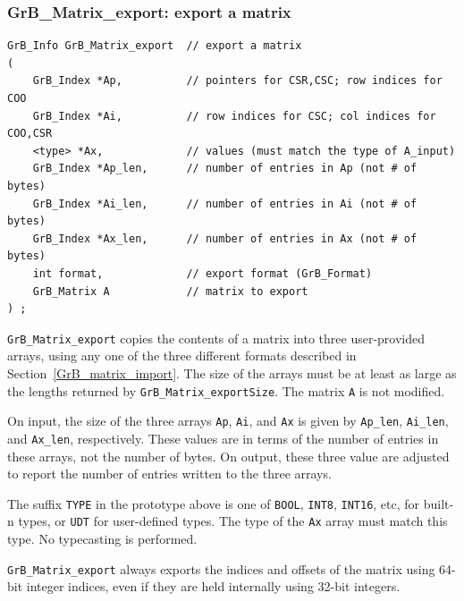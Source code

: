\subsubsection{{\sf GrB\_Matrix\_export:}  export a matrix}
\label{GrB_matrix_export}

\begin{mdframed}[userdefinedwidth=6in]
{\footnotesize
\begin{verbatim}
GrB_Info GrB_Matrix_export  // export a matrix
(
    GrB_Index *Ap,          // pointers for CSR,CSC; row indices for COO
    GrB_Index *Ai,          // row indices for CSC; col indices for COO,CSR
    <type> *Ax,             // values (must match the type of A_input)
    GrB_Index *Ap_len,      // number of entries in Ap (not # of bytes)
    GrB_Index *Ai_len,      // number of entries in Ai (not # of bytes)
    GrB_Index *Ax_len,      // number of entries in Ax (not # of bytes)
    int format,             // export format (GrB_Format)
    GrB_Matrix A            // matrix to export
) ;
\end{verbatim}
} \end{mdframed}

\verb'GrB_Matrix_export' copies the contents of a matrix into three
user-provided arrays, using any one of the three different formats
described in Section~\ref{GrB_matrix_import}.  The size of the arrays must be
at least as large as the lengths returned by \verb'GrB_Matrix_exportSize'.  The
matrix \verb'A' is not modified.

On input, the size of the three arrays \verb'Ap', \verb'Ai', and \verb'Ax' is
given by \verb'Ap_len', \verb'Ai_len', and \verb'Ax_len', respectively.  These
values are in terms of the number of entries in these arrays, not the number of
bytes.  On output, these three value are adjusted to report the number of
entries written to the three arrays.

The suffix \verb'TYPE' in the prototype above is one of \verb'BOOL',
\verb'INT8', \verb'INT16', etc, for built-n types, or \verb'UDT' for
user-defined types.  The type of the \verb'Ax' array must match this type.  No
typecasting is performed.

\verb'GrB_Matrix_export' always exports the indices and offsets of the matrix
using 64-bit integer indices, even if they are held internally using 32-bit
integers.


